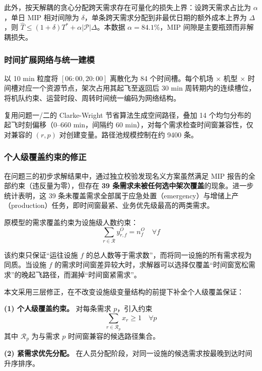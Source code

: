 此外，按天解耦的贪心分配跨天需求存在可量化的损失上界：设跨天需求占比为 $\alpha$，单日 MIP 相对间隙为 $\delta$，单条跨天需求分配到非最优日期的额外成本上界为 $\Delta$，则 $\hat{T} \leq (1+\delta) T^* + \alpha |\mathcal{P}| \Delta$。本数据 $\alpha = 84.1\%$，MIP 间隙是主要瓶颈而非解耦损失。

\subsubsection{时间扩展网络与统一建模}

以 10 min 粒度将 $[06{:}00, 20{:}00]$ 离散化为 84 个时间槽\cite{ford1962}。每个机场 $\times$ 机型 $\times$ 时间槽对应一个资源节点，架次占用其起飞至返回后 30 min 周转期内的连续槽位，将机队约束、运营时段、周转时间统一编码为网络结构。

复用问题一/二的 Clarke-Wright 节省算法生成空间路径，叠加 14 个均匀分布的起飞时刻偏移（0--660 min，间隔约 60 min），对每个需求检查时间窗兼容性，仅对兼容的 $(r, p)$ 对创建变量。路径池规模控制在约 9400 条。

\subsubsection{个人级覆盖约束的修正}

在问题三的初步求解结果中，通过独立校验发现名义方案虽然满足 MIP 报告的全部约束（违反量为零），但存在 \textbf{39 条需求未被任何选中架次覆盖}的现象。进一步统计表明，这 39 条未覆盖需求全部属于应急处置（emergency）与增储上产（production）任务，即时间窗最紧、业务优先级最高的两类需求。

原模型的需求覆盖约束为设施级人数约束：
\begin{equation}
\sum_{r \in \mathcal{R}} y^O_{r,f} = n^O_f \quad \forall f
\end{equation}

该约束只保证``运往设施 $f$ 的总人数等于需求数''，而将同一设施的所有需求视为同质。当设施 $f$ 的需求时间窗差异较大时，求解器可以选择仅覆盖``时间窗宽松需求''的晚起飞路径，而漏掉``时间窗紧需求''。

本文采用三层修正，在不改变设施级变量结构的前提下补全个人级覆盖保证：

\textbf{(1) 个人级覆盖约束。} 对每条需求 $p$，引入约束
\begin{equation}
\sum_{r \in \mathcal{R}_p} x_r \geq 1 \quad \forall p
\end{equation}
其中 $\mathcal{R}_p$ 为与需求 $p$ 时间窗兼容的候选路径集合。

\textbf{(2) 紧需求优先分配。} 在人员分配阶段，对同一设施的候选需求按最晚到达时间升序排序。

